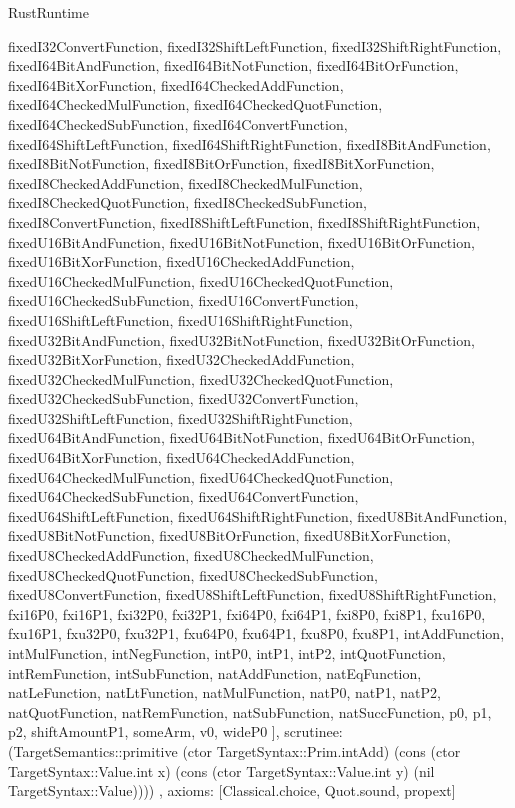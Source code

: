 \begin{lexlean}{RustRuntime}
\begin{semanticmodule}
{{      fixedI32ConvertFunction,
      fixedI32ShiftLeftFunction,
      fixedI32ShiftRightFunction,
      fixedI64BitAndFunction,
      fixedI64BitNotFunction,
      fixedI64BitOrFunction,
      fixedI64BitXorFunction,
      fixedI64CheckedAddFunction,
      fixedI64CheckedMulFunction,
      fixedI64CheckedQuotFunction,
      fixedI64CheckedSubFunction,
      fixedI64ConvertFunction,
      fixedI64ShiftLeftFunction,
      fixedI64ShiftRightFunction,
      fixedI8BitAndFunction,
      fixedI8BitNotFunction,
      fixedI8BitOrFunction,
      fixedI8BitXorFunction,
      fixedI8CheckedAddFunction,
      fixedI8CheckedMulFunction,
      fixedI8CheckedQuotFunction,
      fixedI8CheckedSubFunction,
      fixedI8ConvertFunction,
      fixedI8ShiftLeftFunction,
      fixedI8ShiftRightFunction,
      fixedU16BitAndFunction,
      fixedU16BitNotFunction,
      fixedU16BitOrFunction,
      fixedU16BitXorFunction,
      fixedU16CheckedAddFunction,
      fixedU16CheckedMulFunction,
      fixedU16CheckedQuotFunction,
      fixedU16CheckedSubFunction,
      fixedU16ConvertFunction,
      fixedU16ShiftLeftFunction,
      fixedU16ShiftRightFunction,
      fixedU32BitAndFunction,
      fixedU32BitNotFunction,
      fixedU32BitOrFunction,
      fixedU32BitXorFunction,
      fixedU32CheckedAddFunction,
      fixedU32CheckedMulFunction,
      fixedU32CheckedQuotFunction,
      fixedU32CheckedSubFunction,
      fixedU32ConvertFunction,
      fixedU32ShiftLeftFunction,
      fixedU32ShiftRightFunction,
      fixedU64BitAndFunction,
      fixedU64BitNotFunction,
      fixedU64BitOrFunction,
      fixedU64BitXorFunction,
      fixedU64CheckedAddFunction,
      fixedU64CheckedMulFunction,
      fixedU64CheckedQuotFunction,
      fixedU64CheckedSubFunction,
      fixedU64ConvertFunction,
      fixedU64ShiftLeftFunction,
      fixedU64ShiftRightFunction,
      fixedU8BitAndFunction,
      fixedU8BitNotFunction,
      fixedU8BitOrFunction,
      fixedU8BitXorFunction,
      fixedU8CheckedAddFunction,
      fixedU8CheckedMulFunction,
      fixedU8CheckedQuotFunction,
      fixedU8CheckedSubFunction,
      fixedU8ConvertFunction,
      fixedU8ShiftLeftFunction,
      fixedU8ShiftRightFunction,
      fxi16P0,
      fxi16P1,
      fxi32P0,
      fxi32P1,
      fxi64P0,
      fxi64P1,
      fxi8P0,
      fxi8P1,
      fxu16P0,
      fxu16P1,
      fxu32P0,
      fxu32P1,
      fxu64P0,
      fxu64P1,
      fxu8P0,
      fxu8P1,
      intAddFunction,
      intMulFunction,
      intNegFunction,
      intP0,
      intP1,
      intP2,
      intQuotFunction,
      intRemFunction,
      intSubFunction,
      natAddFunction,
      natEqFunction,
      natLeFunction,
      natLtFunction,
      natMulFunction,
      natP0,
      natP1,
      natP2,
      natQuotFunction,
      natRemFunction,
      natSubFunction,
      natSuccFunction,
      p0,
      p1,
      p2,
      shiftAmountP1,
      someArm,
      v0,
      wideP0
    ],
    scrutinee: (TargetSemantics::primitive (ctor TargetSyntax::Prim.intAdd) (cons (ctor TargetSyntax::Value.int x) (cons (ctor TargetSyntax::Value.int y) (nil TargetSyntax::Value))))
  },
  axioms: [Classical.choice, Quot.sound, propext]
}


\end{semanticmodule}
\end{lexlean}
